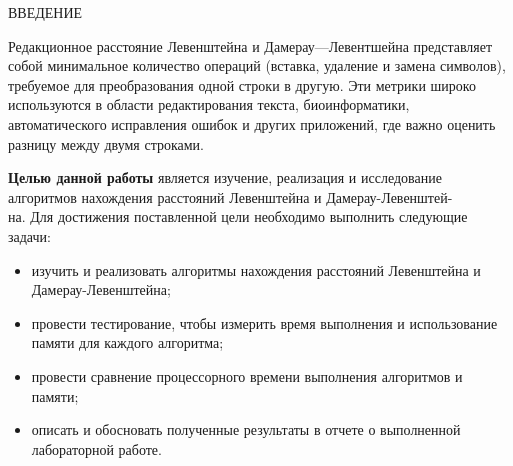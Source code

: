 \begin{center}
	ВВЕДЕНИЕ
\end{center}

Редакционное расстояние Левенштейна и Дамерау---Левентшейна представляет собой минимальное количество операций (вставка, удаление и замена символов), требуемое для преобразования одной строки в другую. Эти метрики широко используются в области редактирования текста, биоинформатики, автоматического исправления ошибок и других приложений, где важно оценить разницу между двумя строками.


\textbf{Целью данной работы} является изучение, реализация и исследование алгоритмов нахождения расстояний Левенштейна и Дамерау-Левенштей-\\на. 
Для достижения поставленной цели необходимо выполнить следующие задачи:
\begin{itemize}
	\item изучить и реализовать алгоритмы нахождения расстояний Левенштейна и Дамерау-Левенштейна;
    \item провести тестирование, чтобы измерить время выполнения и использование памяти для каждого алгоритма;
    \item провести сравнение процессорного времени выполнения алгоритмов и памяти;
	\item описать и обосновать полученные результаты в отчете о выполненной лабораторной работе.
\end{itemize}
